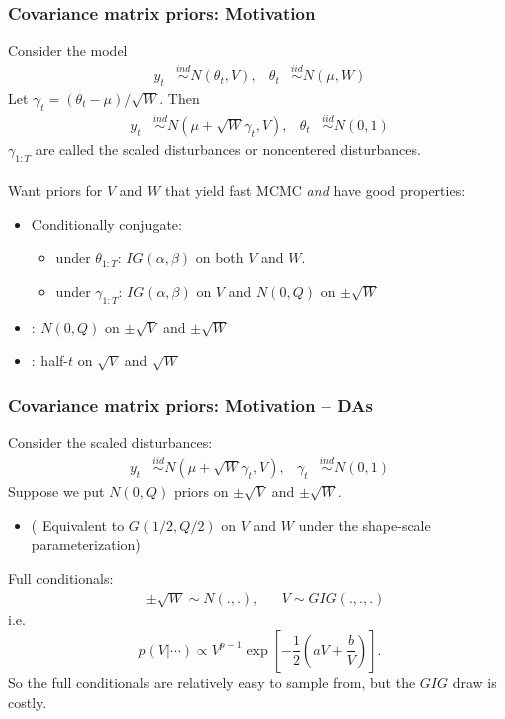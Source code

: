 \documentclass[xcolor=dvipsnames]{beamer}
\begin{document}
\begin{frame}
\frametitle{Covariance matrix priors: Motivation}
Consider the model
\begin{align*}
 y_t &\stackrel{ind}{\sim} N(\theta_t, V), &\theta_t &\stackrel{iid}{\sim} N(\mu,W)
\end{align*}
\pause
Let $\gamma_t=(\theta_t-\mu)/\sqrt{W}$. Then
\begin{align*}
 y_t &\stackrel{ind}{\sim} N(\mu + \sqrt{W}\gamma_t, V), & \theta_t &\stackrel{iid}{\sim} N(0,1)
\end{align*}
$\gamma_{1:T}$ are called the scaled disturbances or noncentered disturbances.\\~\\

\pause Want priors for $V$ and $W$ that yield fast MCMC {\it and} have good properties:
\begin{itemize}
\item Conditionally conjugate:
\begin{itemize}
\item under $\theta_{1:T}$: $IG(\alpha,\beta)$ on both $V$ and $W$.
\item under $\gamma_{1:T}$: $IG(\alpha,\beta)$  on $V$ and $N(0,Q)$ on $\pm\sqrt{W}$
\end{itemize}
\item \citet{fruhwirth2008bayesian}: $N(0,Q)$ on $\pm\sqrt{V}$ and $\pm\sqrt{W}$
\item \citet{gelman2006prior}: half-$t$ on $\sqrt{V}$ and $\sqrt{W}$
\end{itemize}
\end{frame}

\begin{frame}
\frametitle{Covariance matrix priors: Motivation -- DAs}
Consider the scaled disturbances:
\begin{align*}
 y_t &\stackrel{iid}{\sim} N(\mu + \sqrt{W}\gamma_t, V), &\gamma_t &\stackrel{ind}{\sim} N(0,1)
\end{align*}
Suppose we put $N(0,Q)$ priors on $\pm\sqrt{V}$ and $\pm\sqrt{W}$.
\begin{itemize}
\item[]( Equivalent to $G(1/2, Q/2)$ on $V$ and $W$ under the shape-scale parameterization)
\end{itemize}

\pause
Full conditionals:
\begin{align*}
&\pm\sqrt{W}\sim N(.,.), &&V\sim GIG(.,.,.)
\end{align*}
i.e. 
\[
p(V|\cdots)\propto V^{p-1}\exp\left[-\frac{1}{2}\left(a V + \frac{b}{V}\right)\right].
\]
 So the full conditionals are relatively easy to sample from, but the $GIG$ draw is costly.
\end{frame}
\end{document}
